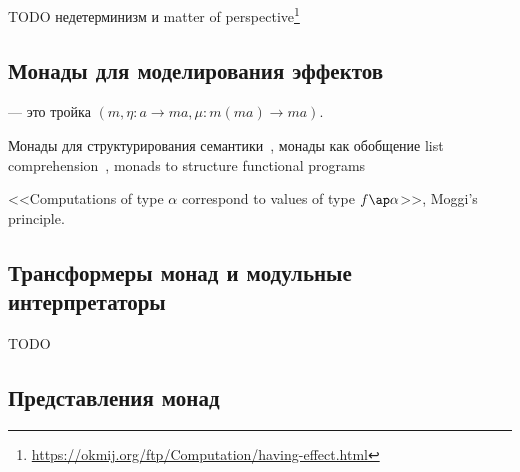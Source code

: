 
TODO недетерминизм и matter of perspective\footnote{\url{https://okmij.org/ftp/Computation/having-effect.html}} %


\subsection{Монады для моделирования эффектов}

 --- это тройка $(m, \eta : a \to m a, \mu : m (m a) \to m a)$.

Монады для структурирования семантики~\cite{moggi1988computational}, монады как обобщение list comprehension~\cite{wadler1990comprehending}, monads to structure functional programs~\cite{wadler1992essence} %

<<Computations of type $\alpha$ correspond to values of type $f\ap\alpha$>>, Moggi's principle. %




\subsection{Трансформеры монад и модульные интерпретаторы}




TODO\cite{liang1995monad} %

\subsection{Представления монад}







